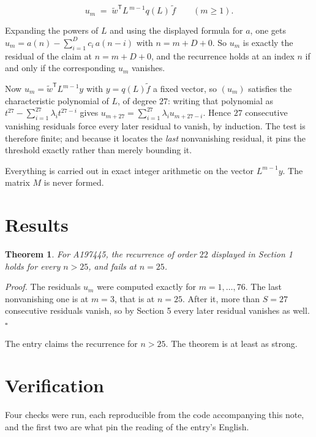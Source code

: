 \documentclass[11pt]{article}
\newtheorem{theorem}{Theorem}
\theoremstyle{definition}
\begin{document}
\[u_m \;=\; \tilde w^{\mathsf T} L^{\,m-1} q(L)\,\tilde f \qquad (m \ge 1).\]

Expanding the powers of $L$ and using the displayed formula for $a$, one gets $u_m = a(n) - \sum_{i=1}^{D} c_i\,a(n-i)$ with $n = m + D + 0$. So $u_m$ is exactly the residual of the claim at $n = m + D + 0$, and the recurrence holds at an index $n$ if and only if the corresponding $u_m$ vanishes.

Now $u_m = \tilde w^{\mathsf T} L^{m-1} y$ with $y = q(L)\tilde f$ a fixed vector, so $(u_m)$ satisfies the characteristic polynomial of $L$, of degree $27$: writing that polynomial as $t^{27} - \sum_{i=1}^{27} \lambda_i t^{27-i}$ gives $u_{m+27} = \sum_{i=1}^{27} \lambda_i u_{m+27-i}$. Hence $27$ consecutive vanishing residuals force every later residual to vanish, by induction. The test is therefore finite; and because it locates the {\itshape last} nonvanishing residual, it pins the threshold exactly rather than merely bounding it.

Everything is carried out in exact integer arithmetic on the vector $L^{m-1}y$. The matrix $M$ is never formed.

\section{Results}

\begin{theorem} For A197445, the recurrence of order $22$ displayed in Section 1 holds for every $n > 25$, and fails at $n = 25$.\end{theorem}

{\itshape Proof.} The residuals $u_m$ were computed exactly for $m = 1,\dots,76$. The last nonvanishing one is at $m = 3$, that is at $n = 25$. After it, more than $S = 27$ consecutive residuals vanish, so by Section 5 every later residual vanishes as well. $\square$

The entry claims the recurrence for $n > 25$. The theorem is at least as strong.

\section{Verification}

Four checks were run, each reproducible from the code accompanying this note, and the first two are what pin the reading of the entry's English.
\end{document}
